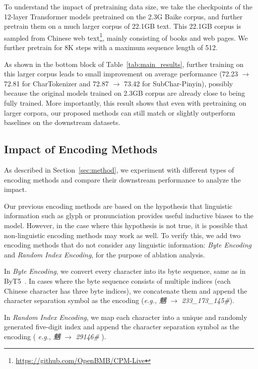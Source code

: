 To understand the impact of pretraining data size, we take the checkpoints of the 12-layer Transformer models pretrained on the 2.3G Baike corpus, and further pretrain them on a much larger corpus of 22.1GB text. This 22.1GB corpus is sampled from Chinese web text\footnote{\url{https://github.com/OpenBMB/CPM-Live}}, mainly consisting of books and web pages. We further pretrain for 8K steps with a maximum sequence length of 512. 

As shown in the bottom block of Table~\ref{tab:main_results}, further training on this larger corpus leads to small improvement on average performance (72.23 $\rightarrow$ 72.81 for CharTokenizer and 72.87 $\rightarrow$ 73.42 for SubChar-Pinyin), possibly because the original models trained on 2.3GB corpus are already close to being fully trained. More importantly, this result shows that even with pretraining on larger corpora, our proposed methods can still match or slightly outperform baselines on the downstream datasets. 

\subsection{Impact of Encoding Methods}
\label{sec:encoding}

As described in Section~\ref{sec:method}, 
we experiment with different types of encoding methods and compare their downstream performance to analyze the impact.

Our previous encoding methods are based on the hypothesis that linguistic information such as glyph or pronunciation provides useful inductive biases to the model. However, in the case where this hypothesis is not true, it is possible that non-linguistic encoding methods may work as well. To verify this, we add two encoding methods that do not consider any linguistic information: \textit{Byte Encoding} and \textit{Random Index Encoding}, for the purpose of ablation analysis.

In \textit{Byte Encoding}, we convert every character into its byte sequence, same as in ByT5~\cite{ByT5}. In cases where the byte sequence consists of multiple indices (each Chinese character has three byte indices), we concatenate them and append the character separation symbol as the encoding (\textit{e.g., 魑} $\rightarrow$ \textit{233\_173\_145\#}). 

In \textit{Random Index Encoding}, we map each character into a unique and randomly generated five-digit index and append the character separation symbol as the encoding ( \textit{e.g., 魑} $\rightarrow$ \textit{29146\#} ). 


